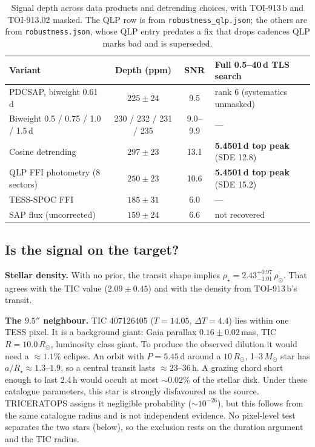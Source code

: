 \documentclass[11pt]{article}
\begin{document}
\begin{table}[h]
\centering
\footnotesize
\begin{tabular}{lccl}
\toprule
Variant & Depth (ppm) & SNR & Full 0.5--40\,d TLS search \\
\midrule
PDCSAP, biweight 0.61\,d & $225 \pm 24$ & 9.5 & rank 6 (systematics unmasked) \\
Biweight 0.5 / 0.75 / 1.0 / 1.5\,d & 230 / 232 / 231 / 235 & 9.0--9.9 & --- \\
Cosine detrending & $297 \pm 23$ & 13.1 & \textbf{5.4501\,d top peak} (SDE 12.8) \\
QLP FFI photometry (8 sectors) & $250 \pm 23$ & 10.6 & \textbf{5.4501\,d top peak} (SDE 15.2) \\
TESS-SPOC FFI & $185 \pm 31$ & 6.0 & --- \\
SAP flux (uncorrected) & $159 \pm 24$ & 6.6 & not recovered \\
\bottomrule
\end{tabular}
\caption{Signal depth across data products and detrending choices, with TOI-913\,b and TOI-913.02 masked. The QLP row is from \texttt{robustness\_qlp.json}; the others are from \texttt{robustness.json}, whose QLP entry predates a fix that drops cadences QLP marks bad and is superseded.}
\label{tab:rob}
\end{table}

\subsection{Is the signal on the target?}
\textbf{Stellar density.} With no prior, the transit shape implies $\rho_\star = 2.43^{+0.97}_{-1.01}\,\rho_\odot$. That agrees with the TIC value ($2.09\pm0.45$) and with the density from TOI-913\,b's transit.

\textbf{The $9.5''$ neighbour.} TIC 407126405 ($T=14.05$, $\Delta T = 4.4$) lies within one TESS pixel. It is a background giant: Gaia parallax $0.16\pm0.02$\,mas, TIC $R = 10.0\,R_\odot$, luminosity class giant. To produce the observed dilution it would need a $\approx1.1\%$ eclipse. An orbit with $P=5.45$\,d around a $10\,R_\odot$, 1--3\,$M_\odot$ star has $a/R_\star \approx 1.3$--$1.9$, so a central transit lasts $\approx23$--36\,h. A grazing chord short enough to last 2.4\,h would occult at most $\sim$0.02\% of the stellar disk. Under these catalogue parameters, this star is strongly disfavoured as the source. \textsc{TRICERATOPS} assigns it negligible probability ($\sim10^{-26}$), but this follows from the same catalogue radius and is not independent evidence. No pixel-level test separates the two stars (below), so the exclusion rests on the duration argument and the TIC radius.
\end{document}
